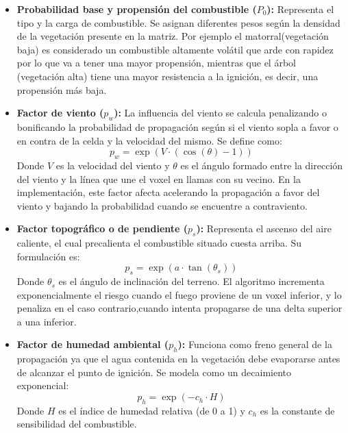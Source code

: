             \begin{itemize}
                \item \textbf{Probabilidad base y propensión del combustible ($P_0$):} Representa el tipo y la carga de combustible. Se asignan diferentes pesos según la densidad de la vegetación presente en la matriz. Por ejemplo el matorral(vegetación baja) es considerado un combustible altamente volátil que arde con rapidez por lo que va a tener una mayor propensión, mientras que el árbol (vegetación alta) tiene una mayor resistencia a la ignición, es decir, una propensión más baja.
                
                \item \textbf{Factor de viento ($p_w$):}  La influencia del viento se calcula penalizando o bonificando la probabilidad de propagación según si el viento sopla a favor o en contra de la celda y la velocidad del mismo. Se define como:
                $$p_w = \exp(V \cdot (\cos(\theta) - 1))$$
                Donde $V$ es la velocidad del viento y $\theta$ es el ángulo formado entre la dirección del viento y la línea que une el voxel en llamas con su vecino. En la implementación, este factor afecta acelerando la propagación a favor del viento y bajando la probabilidad cuando se encuentre a contraviento.

                
                \item \textbf{Factor topográfico o de pendiente ($p_s$):} Representa el ascenso del aire caliente, el cual precalienta el combustible situado cuesta arriba. Su formulación es:
                $$p_s = \exp(a \cdot \tan(\theta_s))$$
                Donde $\theta_s$ es el ángulo de inclinación del terreno. El algoritmo incrementa exponencialmente el riesgo cuando el fuego proviene de un voxel inferior, y lo penaliza en el caso contrario,cuando intenta propagarse de una delta superior a una inferior.

                
                \item \textbf{Factor de humedad ambiental ($p_h$):}  Funciona como freno general de la propagación ya que el agua contenida en la vegetación debe evaporarse antes de alcanzar el punto de ignición. Se modela como un decaimiento exponencial:
                $$p_h = \exp(-c_h \cdot H)$$
                Donde $H$ es el índice de humedad relativa (de 0 a 1) y $c_h$ es la constante de sensibilidad del combustible.

                
            \end{itemize}

